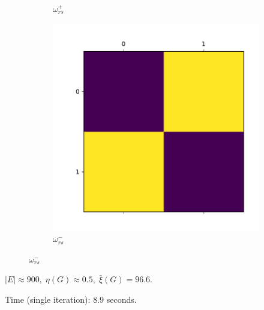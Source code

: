 \documentclass{beamer}
\begin{document}
\begin{frame}[c]
\begin{figure}
\begin{center}
\begin{subfigure}[b]{0.3\textwidth}
				\caption{$\omega ^{+} _{rs} $}
				\label{fig:out/synthetic/omega_positive2.pdf}
			\end{subfigure}
			\begin{subfigure}[b]{0.3\textwidth}
				\centering
				\includegraphics[width=\textwidth]{out/synthetic/omega_negative2.pdf}
				\caption{$\omega ^{-} _{rs} $}
				\label{fig:}
			\end{subfigure}
		\end{center}
	\end{figure}

	$|E| \approx 900, \; \eta(G) \approx 0.5, \; \bar{\xi}(G) = 96.6$.

	Time (single iteration): $8.9$ seconds.
\end{frame}
\end{document}
